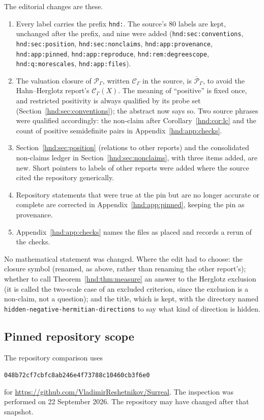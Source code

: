 \documentclass[11pt,oneside]{article}
\theoremstyle{definition}
\theoremstyle{remark}
\newcommand{\Pfield}{\mathscr P_\Gamma}
\newcommand{\pin}{\texttt{048b72cf7cbfc8ab246e4f73788c10460cb3f6e0}}
\begin{document}
The editorial changes are these.
\begin{enumerate}[label=(\arabic*)]
\item Every label carries the prefix \texttt{hnd:}. The source's 80 labels
are kept, unchanged after the prefix, and nine were added
(\texttt{hnd:sec:conventions}, \texttt{hnd:sec:position},
\texttt{hnd:sec:nonclaims}, \texttt{hnd:app:provenance},
\texttt{hnd:app:pinned}, \texttt{hnd:app:reproduce},
\texttt{hnd:rem:degreescope}, \texttt{hnd:q:morescales},
\texttt{hnd:app:files}).
\item The valuation closure of $\Pfield$, written $\mathscr C_\Gamma$ in the
source, is $\overline{\mathscr P}_\Gamma$, to avoid the Hahn--Herglotz
report's $\mathscr C_\Gamma(X)$. The meaning of ``positive'' is fixed once,
and restricted positivity is always qualified by its probe set
(Section~\ref{hnd:sec:conventions}); the abstract now says so. Two
source phrases were qualified accordingly: the non-claim after
Corollary~\ref{hnd:cor:lc} and the count of positive semidefinite pairs in
Appendix~\ref{hnd:app:checks}.
\item Section~\ref{hnd:sec:position} (relations to other reports) and the
consolidated non-claims ledger in Section~\ref{hnd:sec:nonclaims}, with
three items added, are new. Short pointers to labels of other reports were
added where the source cited the repository generically.
\item Repository statements that were true at the pin but are no longer
accurate or complete are corrected in Appendix~\ref{hnd:app:pinned},
keeping the pin as provenance.
\item Appendix~\ref{hnd:app:checks} names the files as placed and records a
rerun of the checks.
\end{enumerate}
No mathematical statement was changed. Where the edit had to choose: the
closure symbol (renamed, as above, rather than renaming the other
report's); whether to call Theorem~\ref{hnd:thm:measure} an answer to the
Herglotz exclusion (it is called the two-scale case of an excluded
criterion, since the exclusion is a non-claim, not a question); and the
title, which is kept, with the directory named
\texttt{hidden-negative-hermitian-directions} to say what kind of direction
is hidden.

\subsection{Pinned repository scope}

The repository comparison uses
\begin{center}
\small\pin
\end{center}
for \url{https://github.com/VladimirReshetnikov/Surreal}.
The inspection was performed on 22 September 2026. The repository may
have changed after that snapshot.
\end{document}
